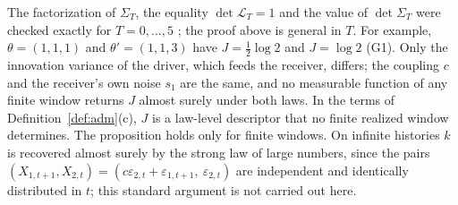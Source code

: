 The factorization of $\Sigma_T$, the equality $\det\mathcal L_T=1$ and the value of $\det\Sigma_T$ were checked exactly for $T=0,\dots,5$ \stS; the proof above is general in $T$. For example, $\theta=(1,1,1)$ and $\theta'=(1,1,3)$ have $J=\tfrac12\log2$ and $J=\log2$ (G1). Only the innovation variance of the driver, which feeds the receiver, differs; the coupling $c$ and the receiver's own noise $s_1$ are the same, and no measurable function of any finite window returns $J$ almost surely under both laws. In the terms of Definition~\ref{def:adm}(c), $J$ is a law-level descriptor that no finite realized window determines. The proposition holds only for finite windows. On infinite histories $k$ is recovered almost surely by the strong law of large numbers, since the pairs $(X_{1,t+1},X_{2,t})=(c\varepsilon_{2,t}+\varepsilon_{1,t+1},\ \varepsilon_{2,t})$ are independent and identically distributed in $t$; this standard argument is not carried out here.

